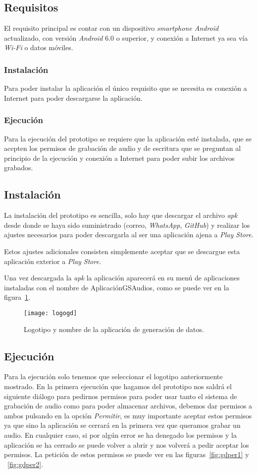 \subsection{Requisitos}
El requisito principal es contar con un dispositivo \textit{smartphone Android} actualizado, con versión \textit{Android} 6.0 o superior, y conexión a Internet ya sea vía \textit{Wi-Fi} o datos móviles.

\subsubsection{Instalación}
Para poder instalar la aplicación el único requisito que se necesita es conexión a Internet para poder descargarse la aplicación.
\subsubsection{Ejecución}
Para la ejecución del prototipo se requiere que la aplicación esté instalada, que se acepten los permisos de grabación de audio y de escritura que se preguntan al principio de la ejecución y conexión a Internet para poder subir los archivos grabados.

\subsection{Instalación}
La instalación del prototipo es sencilla, solo hay que descargar el archivo \textit{apk} desde donde se haya sido suministrado (correo, \textit{WhatsApp}, \textit{GitHub}) y realizar los ajustes necesarios para poder descargarla al ser una aplicación ajena a \textit{Play Store}.

Estos ajustes adicionales consisten simplemente aceptar que se descargue esta aplicación exterior a \textit{Play Store}.

Una vez descargada la \textit{apk} la aplicación aparecerá en su menú de aplicaciones instaladas con el nombre de AplicaciónGSAudios, como se puede ver en la figura~\ref{fig:logogd}.

\begin{figure}[H]
	\centering
	\texttt{[image: logogd]}
	\caption{Logotipo y nombre de la aplicación de generación de datos.}
	\label{fig:logogd}
\end{figure}

\subsection{Ejecución}
Para la ejecución solo tenemos que seleccionar el logotipo anteriormente mostrado. En la primera ejecución que hagamos del prototipo nos saldrá el siguiente diálogo para pedirnos permisos para poder usar tanto el sistema de grabación de audio como para poder almacenar archivos, debemos dar permisos a ambos pulsando en la opción \textit{Permitir}, es muy importante aceptar estos permisos ya que sino la aplicación se cerrará en la primera vez que queramos grabar un audio. En cualquier caso, si por algún error se ha denegado los permisos y la aplicación se ha cerrado se puede volver a abrir y nos volverá a pedir aceptar los permisos. La petición de estos permisos se puede ver en las figuras~\ref{fig:gdper1} y ~\ref{fig:gdper2}.

